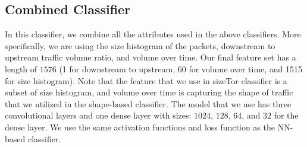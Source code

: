 \subsection{Combined Classifier}
In this classifier, we combine all the attributes used in the above classifiers. More specifically, we are using the size histogram of the packets, downstream to upstream traffic volume ratio, and volume over time. Our final feature set has a length of $1576$ (1 for downstream to upstream, 60 for volume over time, and 1515 for size histogram). Note that the feature that we use in sizeTor classifier is a subset of size histogram, and volume over time is capturing the shape of traffic that we utilized in the shape-based classifier. The model that we use has three convolutional layers and one dense layer with sizes: $1024$, $128$, $64$, and $32$ for the dense layer. We use the same activation functions and loss function as the NN-based classifier.























\begin{comment}
\paragraphb{Extension to Compact Blocks}
The classifier described above works best for the traditional full block relaying mode in which 
\bc peers receive the full blocks at the expected times. 
However, the correlation is weaker in the compact block relaying mode, 
since  only a sketch of each block will be downloaded by each peer, and the sketch will be different for different peers. 
We therefore need to adjust the parameters  of our classifier
(\textit{window size}, $J$) for compact block users. 


According to figure ~\ref{fig:cmpctblock_traffic_volume}, the volume of each compact block has an average of around 13 KB. This value will make the ratio $\frac{block\ size}{BW}$ negligible in comparison to $delta$. So, we consider $\omega$ approximately equal to $delta$. 
Since our experiments is for the high bandwidth mode, the receiving node might receive one block from multiple outgoing nodes. This will make the spike much larger than the average block size shown in Figure~\ref{fig:cmpctblock_traffic_volume}. Also, we consider the average volume of requested transactions. We calculate $\tau$ as follow:
\begin{align*}
\tau_i = 4 \times avg(compact\ block\ size) + avg(requested\ \code{txn}\ volume)
\end{align*}

We use a factor of 4 because in our setting we see that the client receives the transactions from 4 neighbors. 
\end{comment}


